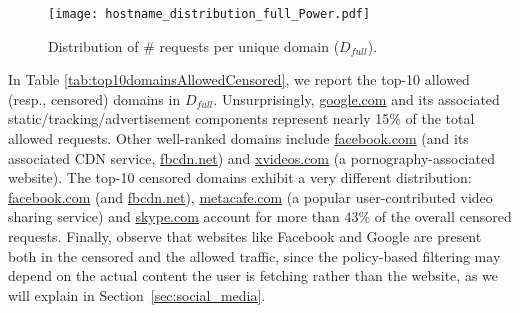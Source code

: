 \documentclass{sig-alternate-2013}
\def\df{$D_{full}$\xspace}
\begin{document}
\begin{figure}[b!]
\centering
\texttt{[image: hostname\_distribution\_full\_Power.pdf]}
\caption{Distribution of \# requests per unique domain (\df).}
\label{fig:cdf_host}
\end{figure} 



In Table \ref{tab:top10domainsAllowedCensored}, we report the top-10 allowed (resp., censored) domains in \df. Unsurprisingly, \url{google.com} and its associated static/tracking/advertisement components represent nearly 15\% of the total allowed requests. Other well-ranked domains include \url{facebook.com} (and its associated CDN service, \url{fbcdn.net}) and \url{xvideos.com} (a pornography-associated  website). 
The top-10 censored domains exhibit a very different distribution: \url{facebook.com} (and \url{fbcdn.net}), \url{metacafe.com} (a popular user-contributed video sharing service)  and \url{skype.com} account for more 
than 43\% of the overall censored requests. Finally, observe that websites like Facebook and Google are present both in the censored and the allowed traffic, since the policy-based filtering  may  depend on the actual content the user is fetching rather than the website, as we will explain in Section~\ref{sec:social_media}.







\begin{table}[t!]
	\centering
	\vspace{0.1cm}
\caption{Top-10 Domains (allowed and censored) in  \df.}
	\label{tab:top10domainsAllowedCensored}
\end{table}
\end{document}
